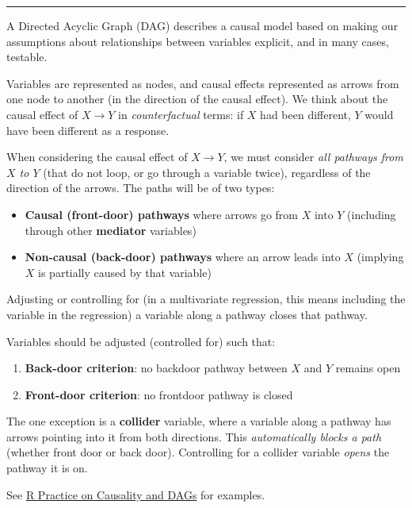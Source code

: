 \documentclass[
]{article}
\providecommand{\tightlist}{%
  \setlength{\itemsep}{0pt}\setlength{\parskip}{0pt}}
\begin{document}
\begin{center}\rule{0.5\linewidth}{0.5pt}\end{center}

A Directed Acyclic Graph (DAG) describes a causal model based on making
our assumptions about relationships between variables explicit, and in
many cases, testable.

Variables are represented as nodes, and causal effects represented as
arrows from one node to another (in the direction of the causal effect).
We think about the causal effect of \(X \rightarrow Y\) in
\emph{counterfactual} terms: if \(X\) had been different, \(Y\) would
have been different as a response.

When considering the causal effect of \(X \rightarrow Y\), we must
consider \emph{all pathways from \(X\) to \(Y\)} (that do not loop, or
go through a variable twice), regardless of the direction of the arrows.
The paths will be of two types:

\begin{itemize}
\tightlist
\item
  \textbf{Causal (front-door) pathways} where arrows go from \(X\) into
  \(Y\) (including through other \textbf{mediator} variables)
\item
  \textbf{Non-causal (back-door) pathways} where an arrow leads into
  \(X\) (implying \(X\) is partially caused by that variable)
\end{itemize}

Adjusting or controlling for (in a multivariate regression, this means
including the variable in the regression) a variable along a pathway
closes that pathway.

Variables should be adjusted (controlled for) such that:

\begin{enumerate}
\def\labelenumi{\arabic{enumi}.}
\tightlist
\item
  \textbf{Back-door criterion}: no backdoor pathway between \(X\) and
  \(Y\) remains open
\item
  \textbf{Front-door criterion}: no frontdoor pathway is closed
\end{enumerate}

The one exception is a \textbf{collider} variable, where a variable
along a pathway has arrows pointing into it from both directions. This
\emph{automatically blocks a path} (whether front door or back door).
Controlling for a collider variable \emph{opens} the pathway it is on.

See \href{/r/3.2-r-answers.Rmd}{R Practice on Causality and DAGs} for
examples.
\end{document}
